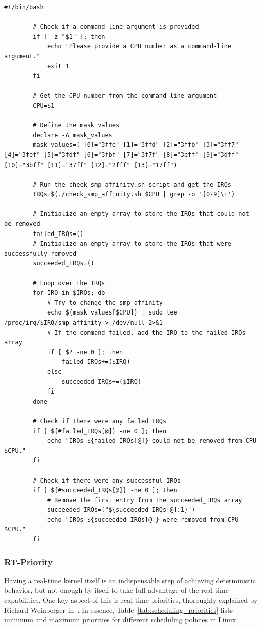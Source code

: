 \documentclass[MMR,Master,english]{style/twbook}
\begin{document}
\clearpage

\vspace*{-5em}
\begin{lstlisting}[name={Script to change IRQ Assignment of a CPU},label={script:change_smp_affinity}]
		#!/bin/bash

		# Check if a command-line argument is provided
		if [ -z "$1" ]; then
			echo "Please provide a CPU number as a command-line argument."
			exit 1
		fi
		
		# Get the CPU number from the command-line argument
		CPU=$1
		
		# Define the mask values
		declare -A mask_values
		mask_values=( [0]="3ffe" [1]="3ffd" [2]="3ffb" [3]="3ff7" [4]="3fef" [5]="3fdf" [6]="3fbf" [7]="3f7f" [8]="3eff" [9]="3dff" [10]="3bff" [11]="37ff" [12]="2fff" [13]="17ff")
		
		# Run the check_smp_affinity.sh script and get the IRQs
		IRQs=$(./check_smp_affinity.sh $CPU | grep -o '[0-9]\+')
		
		# Initialize an empty array to store the IRQs that could not be removed
		failed_IRQs=()
		# Initialize an empty array to store the IRQs that were successfully removed
		succeeded_IRQs=()
		
		# Loop over the IRQs
		for IRQ in $IRQs; do
			# Try to change the smp_affinity
			echo ${mask_values[$CPU]} | sudo tee /proc/irq/$IRQ/smp_affinity > /dev/null 2>&1
			# If the command failed, add the IRQ to the failed_IRQs array
			if [ $? -ne 0 ]; then
				failed_IRQs+=($IRQ)
			else
				succeeded_IRQs+=($IRQ)
			fi
		done
		
		# Check if there were any failed IRQs
		if [ ${#failed_IRQs[@]} -ne 0 ]; then
			echo "IRQs ${failed_IRQs[@]} could not be removed from CPU $CPU."
		fi
		
		# Check if there were any successful IRQs
		if [ ${#succeeded_IRQs[@]} -ne 0 ]; then
			# Remove the first entry from the succeeded_IRQs array
			succeeded_IRQs=("${succeeded_IRQs[@]:1}")
			echo "IRQs ${succeeded_IRQs[@]} were removed from CPU $CPU."
		fi		
\end{lstlisting}

\subsubsection{RT-Priority}
Having a real-time kernel itself is an indispensable step of achieving deterministic behavior, but not enough by itself to take full advantage of the real-time capabilities. One key aspect of this is real-time priorities, thoroughly explained by Richard Weinberger in~\cite{LinuxProcessPriorities}. In essence, Table~\ref{tab:scheduling_priorities} lists minimum and maximum priorities for different scheduling policies in Linux.
\end{document}

